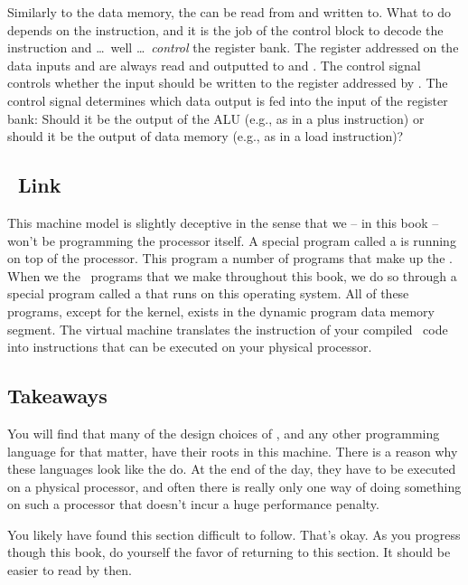 Similarly to the data memory, the  can be read from and written to. What to do depends on the instruction, and it is the job of the control block to decode the instruction and \ldots\ well \ldots\ \textsl{control} the register bank. The register addressed on the data inputs  and  are always read and outputted to  and . The  control signal controls whether the  input should be written to the register addressed by . The  control signal determines which data output is fed into the  input of the register bank: Should it be the output of the ALU (e.g., as in a plus instruction) or should it be the output of data memory (e.g., as in a load instruction)?

\subsection{\csharp\ Link}

This machine model is slightly deceptive in the sense that we -- in this book -- won't be programming the processor itself. A special program called a  is running on top of the processor. This program  a number of programs that make up the . When we  the \csharp\ programs that we make throughout this book, we do so through a special program called a  that runs on this operating system. All of these programs, except for the kernel, exists in the dynamic program data memory segment. The virtual machine translates the  instruction of your compiled \csharp\ code into instructions that can be executed on your physical processor.

\subsection{Takeaways}

You will find that many of the design choices of \csharp, and any other programming language for that matter, have their roots in this machine. There is a reason why these languages look like the do. At the end of the day, they have to be executed on a physical processor, and often there is really only one way of doing something on such a processor that doesn't incur a huge performance penalty.

You likely have found this section difficult to follow. That's okay. As you progress though this book, do yourself the favor of returning to this section. It should be easier to read by then.

